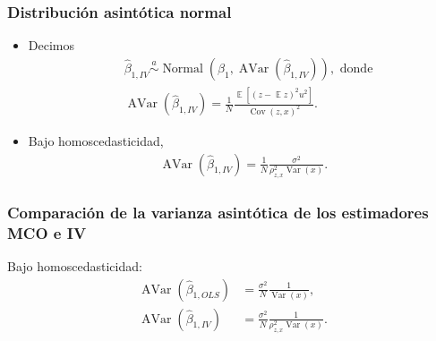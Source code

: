 \documentclass[t, compress, spanish, aspectratio=169]{beamer}
\DeclareMathOperator{\Var}{Var}
\DeclareMathOperator{\Avar}{AVar}
\DeclareMathOperator{\Cov}{Cov}
\DeclareMathOperator{\N}{Normal}
\DeclareMathOperator{\E}{\mathbb{E}}
\newcommand{\adistr}{\stackrel{a}{\sim}}
\begin{document}
\begin{frame}
    \frametitle{Distribuci\'on asint\'otica normal}
    \begin{itemize}
        \item  Decimos
                \begin{align*}
                    &\hat \beta_{1,IV} \adistr \N(\beta_1,\Avar(\hat\beta_{1,IV})),\text{ donde}\\
                    &\Avar(\hat \beta_{1,IV})=\frac{1}{N}\frac{\E[(z-\E z)^2u^2]}{\Cov(z,x)^2}.
                \end{align*}
        \item Bajo homoscedasticidad,
                \begin{align*}
                    \Avar(\hat \beta_{1,IV})=\frac{1}{N}\frac{\sigma^2}{\rho_{z,x}^2\Var(x)}.
                \end{align*}
    \end{itemize}
\end{frame}

\begin{frame}
    \frametitle{Comparaci\'on de la varianza asint\'otica de los estimadores MCO e IV}
    Bajo homoscedasticidad:
            \begin{align*}
            \Avar(\hat \beta_{1,OLS})&=\frac{\sigma^2}{N}\frac{1}{\Var(x)},\\
            \Avar(\hat \beta_{1,IV})&=\frac{\sigma^2}{N}\frac{1}{\rho_{z,x}^2\Var(x)}.
            \end{align*}
\end{frame}
\end{document}
